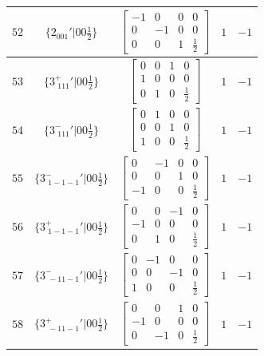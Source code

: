 \documentclass[fleqn,8pt]{jsarticle}
\begin{document}
\begin{longtable}{ccccc}
$ 52 $ & $ \{2{}_{001}{}'|0 0 \frac{1}{2}\} $ & $ \begin{bmatrix} -1 & 0 & 0 & 0 \\ 0 & -1 & 0 & 0 \\ 0 & 0 & 1 & \frac{1}{2} \end{bmatrix} $ & $ 1 $ & $ -1 $ \\ \hline
$ 53 $ & $ \{3^{+}_{\,\,111}{}'|0 0 \frac{1}{2}\} $ & $ \begin{bmatrix} 0 & 0 & 1 & 0 \\ 1 & 0 & 0 & 0 \\ 0 & 1 & 0 & \frac{1}{2} \end{bmatrix} $ & $ 1 $ & $ -1 $ \\ \hline
$ 54 $ & $ \{3^{-}_{\,\,111}{}'|0 0 \frac{1}{2}\} $ & $ \begin{bmatrix} 0 & 1 & 0 & 0 \\ 0 & 0 & 1 & 0 \\ 1 & 0 & 0 & \frac{1}{2} \end{bmatrix} $ & $ 1 $ & $ -1 $ \\ \hline
$ 55 $ & $ \{3^{-}_{\,\,1-1-1}{}'|0 0 \frac{1}{2}\} $ & $ \begin{bmatrix} 0 & -1 & 0 & 0 \\ 0 & 0 & 1 & 0 \\ -1 & 0 & 0 & \frac{1}{2} \end{bmatrix} $ & $ 1 $ & $ -1 $ \\ \hline
$ 56 $ & $ \{3^{+}_{\,\,1-1-1}{}'|0 0 \frac{1}{2}\} $ & $ \begin{bmatrix} 0 & 0 & -1 & 0 \\ -1 & 0 & 0 & 0 \\ 0 & 1 & 0 & \frac{1}{2} \end{bmatrix} $ & $ 1 $ & $ -1 $ \\ \hline
$ 57 $ & $ \{3^{-}_{\,\,-11-1}{}'|0 0 \frac{1}{2}\} $ & $ \begin{bmatrix} 0 & -1 & 0 & 0 \\ 0 & 0 & -1 & 0 \\ 1 & 0 & 0 & \frac{1}{2} \end{bmatrix} $ & $ 1 $ & $ -1 $ \\ \hline
$ 58 $ & $ \{3^{+}_{\,\,-11-1}{}'|0 0 \frac{1}{2}\} $ & $ \begin{bmatrix} 0 & 0 & 1 & 0 \\ -1 & 0 & 0 & 0 \\ 0 & -1 & 0 & \frac{1}{2} \end{bmatrix} $ & $ 1 $ & $ -1 $ \\ \hline

\end{longtable}
\end{document}
